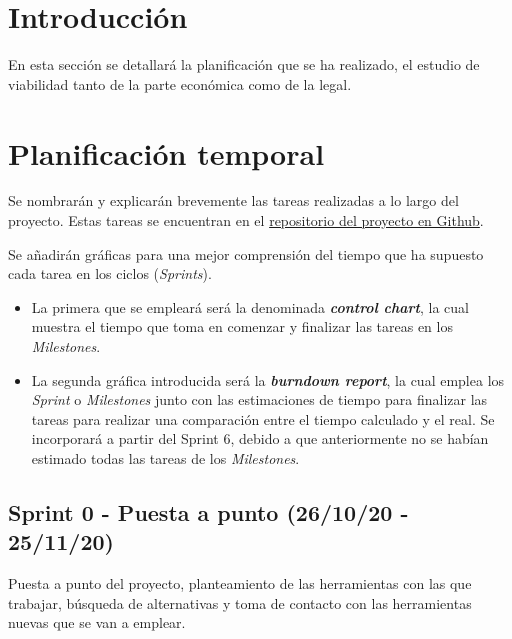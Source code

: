 
\section{Introducción}
En esta sección se detallará la planificación que se ha realizado, el estudio de viabilidad tanto de la parte económica como de la legal. 

\section{Planificación temporal}
Se nombrarán y explicarán brevemente las tareas realizadas a lo largo del proyecto. Estas tareas se encuentran en el \href{https://github.com/dbo1001/Gestor-TFG-2021}{repositorio del proyecto en Github}. 

Se añadirán gráficas para una mejor comprensión del tiempo que ha supuesto cada tarea en los ciclos (\emph{Sprints}). 
\begin{itemize}
	\item La primera que se empleará será la denominada \textbf{\emph{control chart}}, la cual muestra el tiempo que toma en comenzar y finalizar las tareas en los \emph{Milestones}.
	\item La segunda gráfica introducida será la \textbf{\emph{burndown report}}, la cual emplea los \emph{Sprint} o \emph{Milestones} junto con las estimaciones de tiempo para finalizar las tareas para realizar una comparación entre el tiempo calculado y el real. Se incorporará a partir del Sprint 6, debido a que anteriormente no se habían estimado todas las tareas de los \emph{Milestones}.
\end{itemize}

\subsection{Sprint 0 - Puesta a punto (26/10/20 - 25/11/20)}
Puesta a punto del proyecto, planteamiento de las herramientas con las que trabajar, búsqueda de alternativas y toma de contacto con las herramientas nuevas que se van a emplear.

